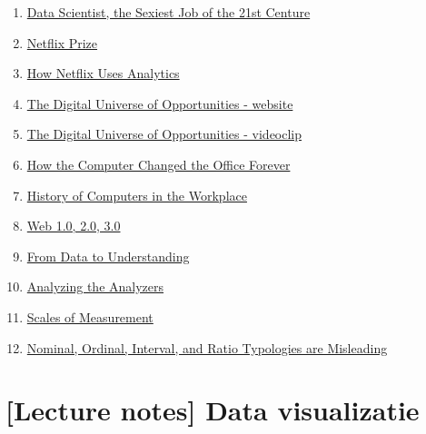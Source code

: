 \documentclass[]{tufte-book}
\providecommand{\tightlist}{%
  \setlength{\itemsep}{0pt}\setlength{\parskip}{0pt}}
\begin{document}
\begin{enumerate}
\def\labelenumi{\arabic{enumi}.}
\tightlist
\item
  \href{https://hbr.org/2012/10/data-scientist-the-sexiest-job-of-the-21st-century}{Data Scientist, the Sexiest Job of the 21st Centure}
\item
  \href{https://en.wikipedia.org/wiki/Netflix_Prize}{Netflix Prize}
\item
  \href{https://blog.kissmetrics.com/how-netflix-uses-analytics/}{How Netflix Uses Analytics}
\item
  \href{https://www.emc.com/leadership/digital-universe/2014iview/index.htm}{The Digital Universe of Opportunities - website}
\item
  \href{http://bcove.me/9s38pkjm}{The Digital Universe of Opportunities - videoclip}
\item
  \href{http://www.bbc.com/news/magazine-23509153}{How the Computer Changed the Office Forever}
\item
  \href{http://www.ehow.com/about_6362639_history-computers-workplace.html}{History of Computers in the Workplace}
\item
  \href{https://www.geeksforgeeks.org/web-1-0-web-2-0-and-web-3-0-with-their-difference/}{Web 1.0, 2.0, 3.0}
\item
  \href{https://en.wikipedia.org/wiki/File:DIKW_(1).png}{From Data to Understanding}
\item
  \href{http://www.oreilly.com/data/free/files/analyzing-the-analyzers.pdf}{Analyzing the Analyzers}
\item
  \href{http://www.mnestudies.com/research/scales-measurement}{Scales of Measurement}
\item
  \href{http://websites.uwlax.edu/tbrooks/eco307/handouts/velleman\%201993\%20-\%20typologies\%20misleading.pdf}{Nominal, Ordinal, Interval, and Ratio Typologies are Misleading}
\end{enumerate}

\hypertarget{lecture-notes-data-visualizatie}{%
\chapter{{[}Lecture notes{]} Data visualizatie}\label{lecture-notes-data-visualizatie}}
\end{document}
